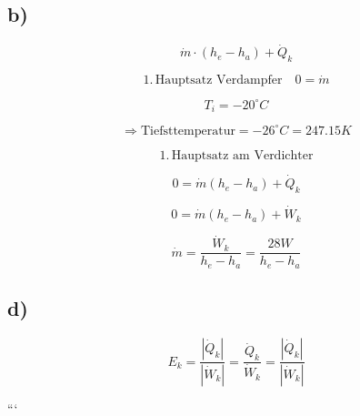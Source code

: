 \subsection*{b)}

\[
\dot{m} \cdot (h_e - h_a) + \dot{Q}_k
\]

\[
1. \, \text{Hauptsatz Verdampfer} \quad 0 = \dot{m}
\]

\[
T_i = -20^\circ C
\]

\[
\Rightarrow \text{Tiefsttemperatur} = -26^\circ C = 247.15 K
\]

\[
1. \, \text{Hauptsatz am Verdichter}
\]

\[
0 = \dot{m} (h_e - h_a) + \dot{Q}_k
\]

\[
0 = \dot{m} (h_e - h_a) + \dot{W}_k
\]

\[
\dot{m} = \frac{\dot{W}_k}{h_e - h_a} = \frac{28 W}{h_e - h_a}
\]

\subsection*{d)}

\[
E_k = \frac{|\dot{Q}_k|}{|\dot{W}_k|} = \frac{\dot{Q}_k}{\dot{W}_k} = \frac{|\dot{Q}_k|}{|\dot{W}_k|}
\]

```